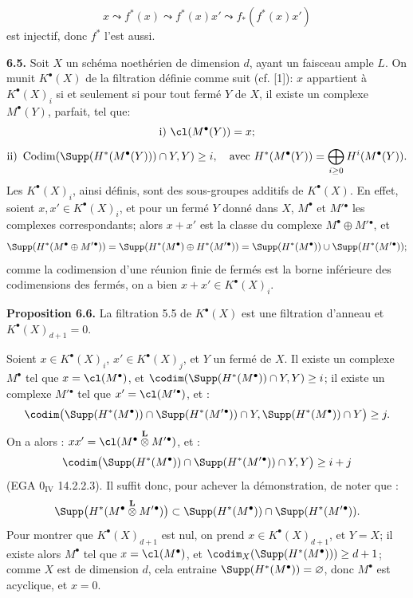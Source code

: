 \[
  x\leadsto f^*(x)\leadsto f^*(x)x'\leadsto f_*(f^*(x)x')
\]
est
injectif, donc $f^*$ l'est aussi.

\textbf{6.5.} Soit $X$ un schéma noethérien de dimension $d$, ayant un faisceau ample $L$. On munit $K^{\bullet}(X)$ de la filtration définie comme suit (cf. [1]): $x$ appartient à $K^{\bullet}(X)_i$ si et seulement si pour tout fermé $Y$ de $X$, il existe un complexe $M^\bullet(Y)$, parfait, tel que:
\[
  \text{i) } \cl(M^\bullet(Y))=x;
\]
\[
  \text{ii) } \operatorname{Codim}(\Supp(H^*(M^\bullet(Y)))\cap Y,Y)\ge i,
  \quad\text{avec } H^*(M^\bullet(Y))=\bigoplus_{i\ge0}H^i(M^\bullet(Y)).
\]
Les $K^{\bullet}(X)_i$, ainsi définis, sont des sous-groupes additifs de $K^{\bullet}(X)$. En effet, soient $x,x'\in K^{\bullet}(X)_i$, et pour un fermé $Y$ donné dans $X$, $M^\bullet$ et $M'{}^\bullet$ les complexes correspondants; alors $x+x'$ est la classe du complexe $M^\bullet\oplus M'{}^\bullet$, et
\[
\Supp(H^*(M^\bullet\oplus M'{}^\bullet))
 =\Supp(H^*(M^\bullet)\oplus H^*(M'{}^\bullet))
 =\Supp(H^*(M^\bullet))\cup\Supp(H^*(M'{}^\bullet));
\]
comme la codimension d'une réunion finie de fermés est la borne inférieure des codimensions des fermés, on a bien $x+x'\in K^{\bullet}(X)_i$.

\textbf{Proposition 6.6.} La filtration 5.5 de $K^{\bullet}(X)$ est une filtration d'anneau et $K^{\bullet}(X)_{d+1}=0$.

Soient $x\in K^{\bullet}(X)_i$, $x'\in K^{\bullet}(X)_j$, et $Y$ un fermé de $X$. Il existe un complexe $M^\bullet$ tel que $x=\cl(M^\bullet)$, et $\codim(\Supp(H^*(M^\bullet))\cap Y,Y)\ge i$; il existe un complexe $M'{}^\bullet$ tel que $x'=\cl(M'{}^\bullet)$, et :
\[
\codim\bigl(\Supp(H^*(M^\bullet))\cap\Supp(H^*(M'{}^\bullet))\cap Y,
            \Supp(H^*(M^\bullet))\cap Y\bigr)\ge j.
\]
On a alors : $xx'=\cl(M^\bullet\overset{\mathbf L}{\otimes}M'{}^\bullet)$, et :
\[
\codim\bigl(\Supp(H^*(M^\bullet))\cap\Supp(H^*(M'{}^\bullet))\cap Y,Y\bigr)\ge i+j
\]
(EGA $0_{\mathrm{IV}}$ 14.2.2.3). Il
suffit donc, pour achever la démonstration, de noter que :
\[
\Supp\bigl(H^*(M^\bullet\overset{\mathbf L}{\otimes}M'{}^\bullet)\bigr)
 \subset \Supp(H^*(M^\bullet))\cap\Supp(H^*(M'{}^\bullet)).
\]
Pour montrer que $K^{\bullet}(X)_{d+1}$ est nul, on prend $x\in K^{\bullet}(X)_{d+1}$, et $Y=X$; il existe alors $M^\bullet$ tel que $x=\cl(M^\bullet)$, et $\codim_X(\Supp(H^*(M^\bullet)))\ge d+1$; comme $X$ est de dimension $d$, cela entraine $\Supp(H^*(M^\bullet))=\varnothing$, donc $M^\bullet$ est acyclique, et $x=0$.


